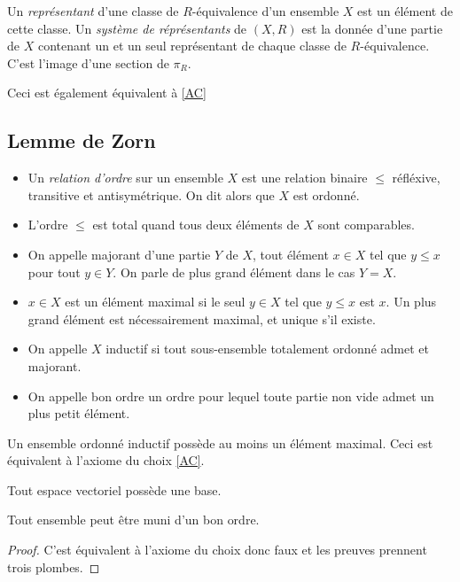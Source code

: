 \documentclass{cours}
\begin{document}
\begin{definition}
    Un \emph{représentant} d'une classe de $R$-équivalence d'un ensemble $X$ est un élément de cette classe. Un \emph{système de réprésentants} de $\left(X, R\right)$ est la donnée d'une partie de $X$ contenant un et un seul représentant de chaque classe de $R$-équivalence. C'est l'image d'une section de $\pi_{R}$.
\end{definition}
\begin{remark}
    Ceci est également équivalent à \ref{AC}
\end{remark}

\subsection{Lemme de Zorn}
\begin{definition}
    \begin{itemize}
        \item Un \emph{relation d'ordre} sur un ensemble $X$ est une relation binaire $\leq$ réfléxive, transitive et antisymétrique. On dit alors que $X$ est ordonné.
        \item L'ordre $\leq$ est total quand tous deux éléments de $X$ sont comparables.
        \item On appelle majorant d'une partie $Y$ de $X$, tout élément $x \in X$ tel que $y \leq x$ pour tout $y \in Y$. On parle de plus grand élément dans le cas $Y = X$.
        \item $x \in X$ est un élément maximal si le seul $y \in X$ tel que $y \leq x$ est $x$. Un plus grand élément est nécessairement maximal, et unique s'il existe.
        \item On appelle $X$ inductif si tout sous-ensemble totalement ordonné admet et majorant.
        \item On appelle bon ordre un ordre pour lequel toute partie non vide admet un plus petit élément.
    \end{itemize}
\end{definition}

\begin{theorem}\label{Zorn}
    Un ensemble ordonné inductif possède au moins un élément maximal. Ceci est équivalent à l'axiome du choix \ref{AC}.
\end{theorem}
\begin{corollary}
    Tout espace vectoriel possède une base.
\end{corollary}
\begin{corollary}\label{Zermelo}
    Tout ensemble peut être muni d'un bon ordre.
\end{corollary}
\begin{proof}
    C'est équivalent à l'axiome du choix donc faux et les preuves prennent trois plombes.
\end{proof}
\end{document}
